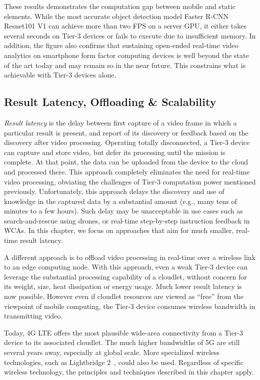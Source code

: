 These results demonstrates the computation gap between mobile and static
elements. While the most accurate object detection model Faster R-CNN Resnet101
V1 can achieve more than two FPS on a server GPU, it either takes several
seconds on Tier-3 devices or fails to execute due to insufficient memory. In
addition, the figure also confirms that sustaining open-ended real-time video
analytics on smartphone form factor computing devices is well beyond the state
of the art today and may remain so in the near future.  This constrains what is
achievable with Tier-3 devices alone.

\subsection{Result Latency, Offloading \& Scalability}
\label{bw:offloading}

{\em Result latency} is the delay between first capture of a video frame in
which a particular result is present, and report of its discovery or feedback
based on the discovery after video processing. Operating totally disconnected, a
Tier-3 device can capture and store video, but defer its processing until the
mission is complete.  At that point, the data can be uploaded from the device to
the cloud and processed there.  This approach completely eliminates the need for
real-time video processing, obviating the challenges of Tier-3 computation power
mentioned previously. Unfortunately, this approach delays the discovery and use
of knowledge in the captured data by a substantial amount (e.g., many tens of
minutes to a few hours).  Such delay may be unacceptable in use cases such as
search-and-rescue using drones, or real-time step-by-step instruction feedback
in WCAs. In this chapter, we focus on approaches that aim for much smaller,
real-time result latency.

A different approach is to offload video processing in real-time over a wireless
link to an edge computing node. With this approach, even a weak Tier-3 device
can leverage the substantial processing capability of a cloudlet, without
concern for its weight, size, heat dissipation or energy usage.  Much lower
result latency is now possible.  However even if cloudlet resources are viewed
as ``free'' from the viewpoint of mobile computing, the Tier-3 device consumes
wireless bandwidth in transmitting video.

Today, 4G LTE offers the most plausible wide-area connectivity from a Tier-3
device to its associated cloudlet. The much higher bandwidths of 5G are still
several years away, especially at global scale.  More specialized wireless
technologies, such as Lightbridge 2~\cite{LightBridge2}, could also
be used. Regardless of specific wireless technology, the principles and
techniques described in this chapter apply.

